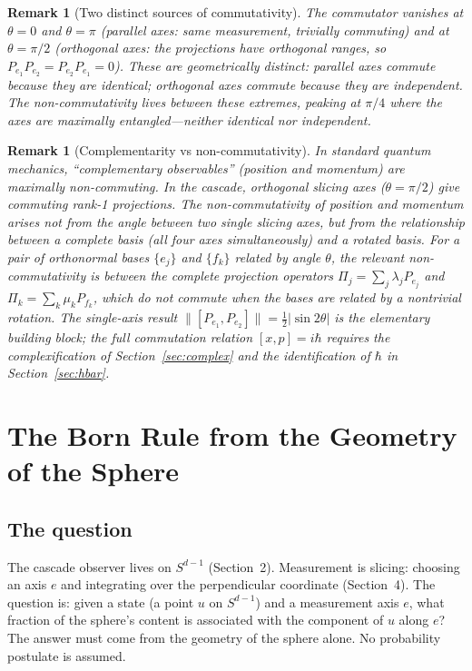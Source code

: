 \documentclass[12pt,a4paper]{article}
\newtheorem{remark}[theorem]{Remark}
\begin{document}
\begin{remark}[Two distinct sources of commutativity]
The commutator vanishes at $\theta = 0$ and $\theta = \pi$ (parallel axes: same
measurement, trivially commuting) and at $\theta = \pi/2$ (orthogonal axes: the projections
have orthogonal ranges, so $P_{e_1}P_{e_2} = P_{e_2}P_{e_1} = 0$). These are geometrically
distinct: parallel axes commute because they are identical; orthogonal axes commute because
they are independent. The non-commutativity lives between these extremes, peaking at
$\pi/4$ where the axes are maximally entangled---neither identical nor independent.
\end{remark}

\begin{remark}[Complementarity vs non-commutativity]
In standard quantum mechanics, ``complementary observables'' (position and momentum) are
maximally non-commuting. In the cascade, orthogonal slicing axes ($\theta = \pi/2$) give
\emph{commuting} rank-1 projections. The non-commutativity of position and momentum arises
not from the angle between two single slicing axes, but from the relationship between a
\emph{complete basis} (all four axes simultaneously) and a rotated basis. For a pair of
orthonormal bases $\{e_j\}$ and $\{f_k\}$ related by angle $\theta$, the relevant
non-commutativity is between the complete projection operators
$\Pi_j = \sum_j \lambda_j P_{e_j}$ and $\Pi_k = \sum_k \mu_k P_{f_k}$, which do not
commute when the bases are related by a nontrivial rotation. The single-axis result
$\|[P_{e_1},P_{e_2}]\| = \tfrac{1}{2}|\!\sin 2\theta|$ is the elementary building block;
the full commutation relation $[x,p] = i\hbar$ requires the complexification of
Section~\ref{sec:complex} and the identification of $\hbar$ in Section~\ref{sec:hbar}.
\end{remark}

\section{The Born Rule from the Geometry of the Sphere}\label{sec:the-born-rule-from-the-geometry-of-the-s}

\subsection{The question}

The cascade observer lives on $S^{d-1}$ (Section~2). Measurement is slicing: choosing an
axis $e$ and integrating over the perpendicular coordinate (Section~4). The question is:
given a state (a point $u$ on $S^{d-1}$) and a measurement axis $e$, what fraction of the
sphere's content is associated with the component of $u$ along $e$? The answer must come
from the geometry of the sphere alone. No probability postulate is assumed.
\end{document}
